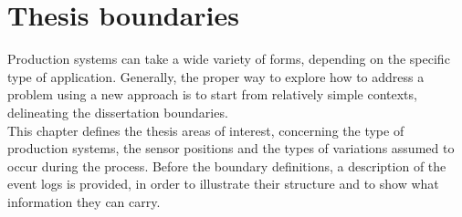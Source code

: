 \chapter{Thesis boundaries}
\label{chapter 3}
\ifpdf
    \graphicspath{{Chapter3/Figs/}{Chapter3/Figs/PDF/}{Chapter3/Figs/}}
\else
    \graphicspath{{Chapter3/Figs/Vector/}{Chapter3/Figs/}}
\fi
Production systems can take a wide variety of forms, depending on the specific type of application. Generally, the proper way to explore how to address a problem using a new approach is to start from relatively simple contexts, delineating the dissertation boundaries. \\
This chapter defines the thesis areas of interest, concerning the type of production systems, the sensor positions and the types of variations assumed to occur during the process. Before the boundary definitions, a description of the event logs is provided, in order to illustrate their structure and to show what information they can carry. 
